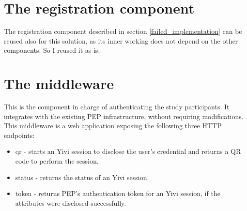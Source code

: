 \documentclass{report}
\begin{document}
\section{The registration component}
The registration component described in section \ref{failed_implementation} can be reused also for this solution, as its inner working does not depend on the other components. So I
reused it as-is.

\section{The middleware}\label{middleware}
This is the component in charge of authenticating the study participants. It integrates with the existing PEP infrastructure, without requiring modifications. This middleware is a web 
application exposing the following three HTTP endpoints:

\begin{itemize}
	\item qr - starts an Yivi session to disclose the user's credential and returns a QR code to perform the session.
	\item status - returns the status of an Yivi session.
	\item token - returns PEP's authentication token for an Yivi session, if the attributes were disclosed successfully.
\end{itemize}
\end{document}
